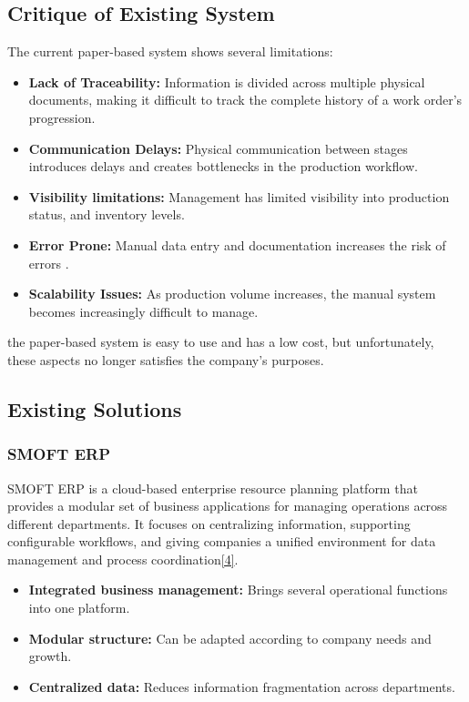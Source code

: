 \subsection{Critique of Existing System}

The current paper-based system shows several limitations:

\begin{itemize}
    \item \textbf{Lack of Traceability:} Information is divided across multiple physical documents, making it difficult to track the complete history of a work order's progression.
    \item \textbf{Communication Delays:} Physical communication between stages introduces delays and creates bottlenecks in the production workflow.
    \item \textbf{Visibility limitations:} Management has limited visibility into production status, and inventory levels.
    \item \textbf{Error Prone:} Manual data entry and documentation increases the risk of errors .
    \item \textbf{Scalability Issues:} As production volume increases, the manual system becomes increasingly difficult to manage.
\end{itemize}

the paper-based system is easy to use and has a low cost, but unfortunately, these aspects no longer satisfies the company’s purposes.
\subsection{Existing Solutions}
\subsubsection{SMOFT ERP}
SMOFT ERP is a cloud-based enterprise resource planning platform that provides a modular set of business applications for managing operations across different departments. It focuses on centralizing information, supporting configurable workflows, and giving companies a unified environment for data management and process coordination\hyperref[ref:SMOFT]{[4]}.

\begin{itemize}
    \item \textbf{Integrated business management:} Brings several operational functions into one platform.
    \item \textbf{Modular structure:} Can be adapted according to company needs and growth.
    \item \textbf{Centralized data:} Reduces information fragmentation across departments.
\end{itemize}

